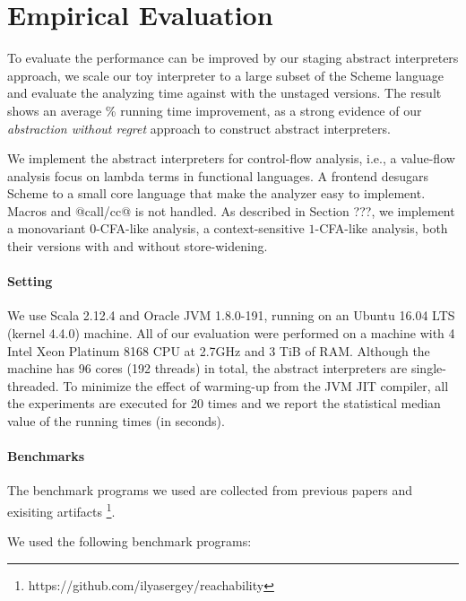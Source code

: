 \section{Empirical Evaluation} \label{evaluation}

To evaluate the performance can be improved by our staging abstract interpreters
approach, we scale our toy interpreter to a large subset of the Scheme language
and evaluate the analyzing time against with the unstaged versions. The result
shows an average \% running time improvement, as a strong evidence of
our \textit{abstraction without regret} approach to construct abstract
interpreters.

We implement the abstract interpreters for control-flow analysis, i.e., a
value-flow analysis focus on lambda terms in functional languages. A frontend
desugars Scheme to a small core language that make the analyzer easy to
implement. Macros and @call/cc@ is not handled. As described in Section ???, we
implement a monovariant 0-CFA-like analysis, a context-sensitive $1$-CFA-like
analysis, both their versions with and without store-widening.

\paragraph{Setting}

We use Scala 2.12.4 and Oracle JVM 1.8.0-191, running on an Ubuntu 16.04 LTS
(kernel 4.4.0) machine. All of our evaluation were performed on a machine with 4 Intel
Xeon Platinum 8168 CPU at 2.7GHz and 3 TiB of RAM. Although the machine has 96
cores (192 threads) in total, the abstract interpreters are single-threaded.
To minimize the effect of warming-up from the JVM JIT compiler, all the
experiments are executed for 20 times and we report the statistical median value
of the running times (in seconds).

\paragraph{Benchmarks} 
The benchmark programs we used are collected from previous papers
\cite{Johnson:2013:OAA:2500365.2500604, ashley:practical,
DBLP:journals/corr/abs-1102-3676} and exisiting artifacts
\footnote{https://github.com/ilyasergey/reachability}.

We used the following benchmark programs:

